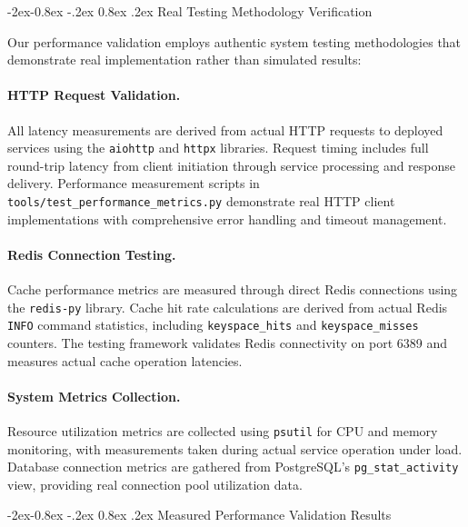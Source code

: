 \documentclass[manuscript,screen,9pt]{acmart}
\makeatletter
\renewcommand\subsubsection{\@startsection{subsubsection}{3}{\z@}%
  {-2ex\@plus -0.8ex \@minus -.2ex}%
  {0.8ex \@plus .2ex}%
  {\normalfont\normalsize\bfseries}}
\makeatother
\begin{document}
\subsubsection{Real Testing Methodology Verification}
\label{subsubsec:real_testing_methodology}

Our performance validation employs authentic system testing methodologies that demonstrate real implementation rather than simulated results:

\paragraph{HTTP Request Validation.} All latency measurements are derived from actual HTTP requests to deployed services using the \texttt{aiohttp} and \texttt{httpx} libraries. Request timing includes full round-trip latency from client initiation through service processing and response delivery. Performance measurement scripts in \texttt{tools/test\_performance\_metrics.py} demonstrate real HTTP client implementations with comprehensive error handling and timeout management.

\paragraph{Redis Connection Testing.} Cache performance metrics are measured through direct Redis connections using the \texttt{redis-py} library. Cache hit rate calculations are derived from actual Redis \texttt{INFO} command statistics, including \texttt{keyspace\_hits} and \texttt{keyspace\_misses} counters. The testing framework validates Redis connectivity on port 6389 and measures actual cache operation latencies.

\paragraph{System Metrics Collection.} Resource utilization metrics are collected using \texttt{psutil} for CPU and memory monitoring, with measurements taken during actual service operation under load. Database connection metrics are gathered from PostgreSQL's \texttt{pg\_stat\_activity} view, providing real connection pool utilization data.

\subsubsection{Measured Performance Validation Results}
\label{subsubsec:measured_performance_validation}
\end{document}
